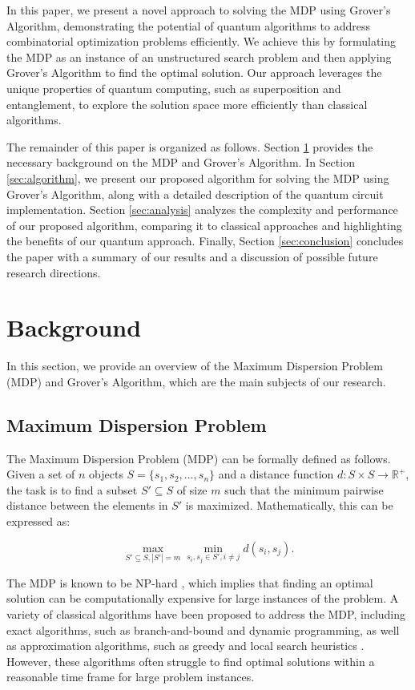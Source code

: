 In this paper, we present a novel approach to solving the MDP using Grover's Algorithm, demonstrating the potential of quantum algorithms to address combinatorial optimization problems efficiently. We achieve this by formulating the MDP as an instance of an unstructured search problem and then applying Grover's Algorithm to find the optimal solution. Our approach leverages the unique properties of quantum computing, such as superposition and entanglement, to explore the solution space more efficiently than classical algorithms.

The remainder of this paper is organized as follows. Section \ref{sec:background} provides the necessary background on the MDP and Grover's Algorithm. In Section \ref{sec:algorithm}, we present our proposed algorithm for solving the MDP using Grover's Algorithm, along with a detailed description of the quantum circuit implementation. Section \ref{sec:analysis} analyzes the complexity and performance of our proposed algorithm, comparing it to classical approaches and highlighting the benefits of our quantum approach. Finally, Section \ref{sec:conclusion} concludes the paper with a summary of our results and a discussion of possible future research directions.

\section{Background}
\label{sec:background}
In this section, we provide an overview of the Maximum Dispersion Problem (MDP) and Grover's Algorithm, which are the main subjects of our research.

\subsection{Maximum Dispersion Problem}
The Maximum Dispersion Problem (MDP) can be formally defined as follows. Given a set of $n$ objects $S = \{s_1, s_2, \dots, s_n\}$ and a distance function $d: S \times S \rightarrow \mathbb{R}^+$, the task is to find a subset $S' \subseteq S$ of size $m$ such that the minimum pairwise distance between the elements in $S'$ is maximized. Mathematically, this can be expressed as:

\begin{equation}
\label{eq:mdp}
    \max_{S' \subseteq S, |S'| = m} \min_{s_i, s_j \in S', i \neq j} d(s_i, s_j).
\end{equation}

The MDP is known to be NP-hard \cite{mdp_np_hard}, which implies that finding an optimal solution can be computationally expensive for large instances of the problem. A variety of classical algorithms have been proposed to address the MDP, including exact algorithms, such as branch-and-bound and dynamic programming, as well as approximation algorithms, such as greedy and local search heuristics \cite{mdp_classical_algorithms}. However, these algorithms often struggle to find optimal solutions within a reasonable time frame for large problem instances.

